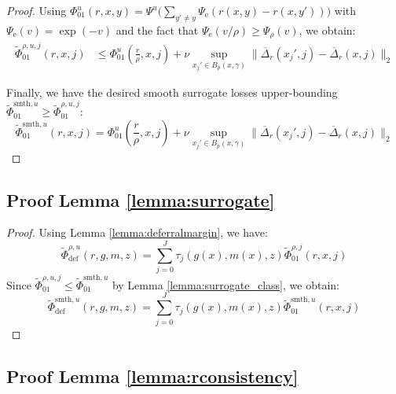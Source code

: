 \begin{appendices}
\begin{proof}
Using \(\Phi_{01}^u(r, x, y) = \Psi^u\big(\sum_{y' \neq y} \Psi_{\text{e}}(r(x, y) - r(x, y'))\big)\) with \(\Psi_{\text{e}}(v) = \exp(-v)\) and the fact that \(\Psi_{\text{e}}(v / \rho) \geq \Psi_\rho(v)\), we obtain:
\begin{equation}
\begin{aligned}
    \widetilde{\Phi}_{01}^{\rho,u,j}(r, x, j) & \leq \Phi_{01}^u\left(\frac{r}{\rho}, x, j\right) + \nu \sup_{x_j' \in B_p(x, \gamma)} \| \overline{\Delta}_r(x_j', j) - \overline{\Delta}_r(x, j) \|_2
\end{aligned}
\end{equation}

Finally, we have the desired smooth surrogate losses upper-bounding $ \widetilde{\Phi}_{01}^{\text{smth}, u} \geq \widetilde{\Phi}_{01}^{\rho,u,j}$:
\begin{equation}
    \widetilde{\Phi}_{01}^{\text{smth}, u}(r, x, j) = \Phi_{01}^u\left(\frac{r}{\rho}, x, j\right) + \nu \sup_{x_j' \in B_p(x, \gamma)} \| \overline{\Delta}_r(x_j', j) - \overline{\Delta}_r(x, j) \|_2
\end{equation}
\end{proof}


\subsection{Proof Lemma \ref{lemma:surrogate}}\label{proof:surrogate}
\robustsurrogate*
\begin{proof}
Using Lemma \ref{lemma:deferralmargin}, we have:
\begin{equation}
    \widetilde{\Phi}^{\rho, u}_{\text{def}}(r, g,m,z) = \sum_{j=0}^J \tau_j(g(x),m(x),z) \widetilde{\Phi}^{\rho, j}_{01}(r, x, j) 
\end{equation}
Since \(\widetilde{\Phi}^{\rho,u,j}_{01} \leq \widetilde{\Phi}^{\text{smth}, u}_{01}\) by Lemma \ref{lemma:surrogate_class}, we obtain:
\begin{equation}
    \widetilde{\Phi}^{\text{smth}, u}_{\text{def}}(r, g,m,z) = \sum_{j=0}^J \tau_j(g(x),m(x),z) \widetilde{\Phi}^{\text{smth}, u}_{01}(r, x, j)
\end{equation}
\end{proof}






\subsection{Proof Lemma \ref{lemma:rconsistency}}
\rconsistency* \label{proof:rconsistency}


\end{appendices}
